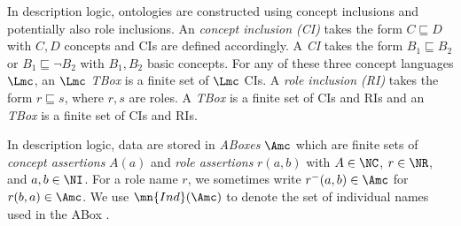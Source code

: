 \documentclass{lmcs}
\theoremstyle{definition}
\begin{document}
In description logic, ontologies are constructed using concept
inclusions and potentially also role inclusions. An \emph{\ALCI
  concept inclusion (CI)} takes the form $C \sqsubseteq D$ with $C,D$
\ALCI concepts and \EL CIs are defined accordingly.  A
\emph{\dllitecore CI} takes the form $B_{1}\sqsubseteq B_{2}$ or
$B_{1}\sqsubseteq \neg B_{2}$ with $B_{1},B_{2}$ basic concepts. For
any of these three concept languages $\Lmc$, an \emph{$\Lmc$ TBox} is
a finite set of $\Lmc$ CIs. A \emph{role inclusion (RI)} takes the form
$r\sqsubseteq s$, where $r,s$ are roles. A \emph{\dlliter TBox} is a
finite set of \dllitecore CIs and RIs and an \emph{\alchi TBox} is a
finite set of \alci CIs and RIs.



In description logic, data are stored in \emph{ABoxes} $\Amc$ which are finite sets of \emph{concept assertions} $A(a)$ and 
\emph{role assertions} $r(a,b)$ with $A \in \NC$, $r \in \NR$, and $a,b 
\in \NI$. For a role name $r$, we sometimes write $r^{-}(a,b)\in \Amc$ for $r(b,a)\in \Amc$.
We use $\mn{Ind}(\Amc)$ to denote the set of individual names used in the ABox \Amc. 
\end{document}
